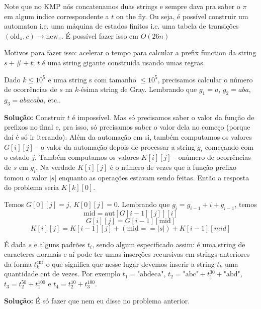 Note que no KMP nós concatenamos duas strings e sempre dava pra saber o $\pi$ em algum índice correspondente a $t$ on the fly. Ou seja, é possível construir um automaton i.e. uma máquina de estados finitos i.e. uma tabela de transições $(\text{old}_{\pi}, c) \to \text{new}_{\pi}$. É possível fazer isso em $O(26n)$


Motivos para fazer isso: acelerar o tempo para calcular a prefix function da string $s + \# + t$; $t$ é uma string gigante construída usando umas regras.

 Dado $k \leq 10^5$ e uma string s com tamanho $\leq 10^5$, precisamos calcular o número de ocorrências de $s$ na $k$-ésima string de Gray. Lembrando que $g_1 = a$, $g_2 = aba$, $g_3 = abacaba$, etc..

\textbf{Solução:} Construir $t$ é impossível. Mas só precisamos saber o valor da função de prefixos no final e, pra isso, só precisamos saber o valor dela no começo (porque daí é só ir iterando). Além da automação em si, também computamos os valores $G[i][j]$ - o valor da automação depois de processar a string $g_i$ começando com o estado $j$. Também computamos os valores $K[i][j]$ - onúmero de ocorrências de $s$ em $g_i$. Na verdade $K[i][j]$ é o número de vezes que a função prefixo tomou o valor $|s|$ enquanto as operações estavam sendo feitas. Então a resposta do problema seria $K[k][0]$.

Temos $G[0][j] = j$, $K[0][j] = 0$. Lembrando que $g_i = g_{i-1} + i + g_{i-1}$, temos
$$\text{mid} = \text{aut}[G[i-1][j]][i]$$
$$G[i][j] = G[i-1][\text{mid}]$$
$$K[i][j] = K[i-1][j] + (\text{mid} == |s|) + K[i-1][mid]$$

 É dada $s$ e alguns padrões $t_i$, sendo algum especificado assim: é uma string de caracteres normais e aí pode ter umas inserções recursivas em strings anteriores da forma $t_k^{\text{cnt}}$ o que significa que nesse lugar devemos inserir a string $t_k$ uma quantidade cnt de vezes. Por exemplo $t_1 = \text{"abdeca"}$, $t_2 = \text{"abc"} + t_1^{30} + \text{"abd"}$, $t_3 = t_2^{50} + t_1^{100}$ e $t_4 = t_2^{10} + t_3^{100}$.

\textbf{Solução:} É só fazer que nem eu disse no problema anterior.